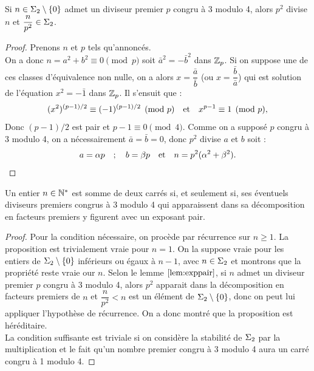 \begin{lem}
\label{lem:exppair}
Si $n \in \Sigma_2 \setminus \{ 0 \}$ admet un diviseur premier $p$ congru à 3 modulo 4, alors $p^2$ divise $n$ et $\dfrac{n}{p^2} \in \Sigma_2$.
\end{lem}

\begin{proof}
Prenons $n$ et $p$ tels qu'annoncés. \\
On a donc $n = a^2 + b^2 \equiv 0 \pmod p$ soit $\bar{a}^2 = - \bar{b}^2$ dans $\mathbb{Z}_p$.
Si on suppose une de ces classes d'équivalence non nulle, on a alors $x = \dfrac{\bar{a}}{\bar{b}}$ (ou $x = \dfrac{\bar{b}}{\bar{a}}$)
qui est solution de l'équation $x^2 = - \bar{1}$ dans $\mathbb{Z}_p$. 
Il s'ensuit que :
\[ (x^2)^{(p-1)/2} \equiv (-1)^{(p-1)/2} \pmod p \quad \text{et} \quad x^{p-1} \equiv 1 \pmod p , \]
Donc $(p-1)/2$ est pair et $p-1 \equiv 0 \pmod 4$.
Comme on a supposé $p$ congru à 3 modulo 4, on a nécessairement $\bar{a}=\bar{b}=0$, donc $p^2$ divise $a$ et $b$ soit :
\[ a = \alpha p \quad ; \quad b = \beta p \quad \text{et} \quad n = p^2(\alpha^2+\beta^2) . \]
\end{proof}

\begin{thm}
Un entier $n \in \mathbb{N}^\ast$ est somme de deux carrés si, et seulement si, ses éventuels diviseurs premiers congrus à 3 modulo 4 qui
apparaissent dans sa décomposition en facteurs premiers y figurent avec un exposant pair.
\end{thm}

\begin{proof}
Pour la condition nécessaire, on procède par récurrence sur $n \geq 1$. La proposition est trivialement vraie pour $n=1$.
On la suppose vraie pour les entiers de $\Sigma_2 \setminus \{ 0 \}$ inférieurs ou égaux à $n-1$, avec $n \in \Sigma_2$ et montrons que la
propriété reste vraie our $n$. Selon le lemme $\ref{lem:exppair}$, si $n$ admet un diviseur premier $p$ congru à 3 modulo 4,
alors $p^2$ apparait dans la décomposition en facteurs premiers de $n$ 
et $\dfrac{n}{p^2} < n$ est un élément de $\Sigma_2 \setminus \{ 0 \}$, donc on peut lui appliquer l'hypothèse de récurrence.
On a donc montré que la proposition est héréditaire. \\

La condition suffisante est triviale si on considère la stabilité de $\Sigma_2$ par la multiplication et le fait qu'un nombre premier
congru à 3 modulo 4 aura un carré congru à 1 modulo 4.
\end{proof}

